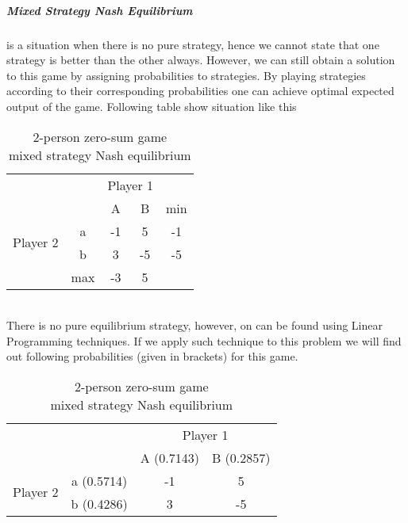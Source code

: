 \documentclass[10pt, a4paper]{report}
\begin{document}
\subparagraph{Mixed Strategy Nash Equilibrium} is a situation when there is no pure strategy, hence we cannot state that one strategy is better than the other always. However, we can still obtain a solution to this game by assigning probabilities to strategies. By playing strategies according to their corresponding probabilities one can achieve optimal expected output of the game. Following table show situation like this
\begin{table}[ht!]
	\hspace{-2em}
	\centering
	\begin{tabular}{cccc|c}
		& & \multicolumn{2}{c}{Player 1} &                                \\ \cline{3-4}
		& & A & \multicolumn{1}{c}{B} & min                               \\ \cline{3-4}
		\multirow{2}{*}{Player 2} & \multicolumn{1}{|c|}{a} & -1 & 5 & -1 \\
		& \multicolumn{1}{|c|}{b} & 3 & -5 & -5                           \\ \cline{3-4}
		& max & -3 & \multicolumn{1}{c}{5} &
	\end{tabular}
	\caption{2-person zero-sum game\\mixed strategy Nash equilibrium}
\end{table}
\\
There is no pure equilibrium strategy, however, on can be found using Linear Programming techniques. If we apply such technique to this problem we will find out following probabilities (given in brackets) for this game.
\begin{table}[ht!]
	\hspace{-2em}
	\centering
	\begin{tabular}{cccc|}
		& & \multicolumn{2}{c}{Player 1}                                      \\ \cline{3-4}
		& & A (0.7143)& \multicolumn{1}{c}{B (0.2857)}                        \\ \cline{3-4}
		\multirow{2}{*}{Player 2} & \multicolumn{1}{|c|}{a (0.5714)} & -1 & 5 \\
		& \multicolumn{1}{|c|}{b (0.4286)} & 3 & -5                           \\ \cline{3-4}
	\end{tabular}
	\caption{2-person zero-sum game\\mixed strategy Nash equilibrium}
\end{table}
\end{document}
